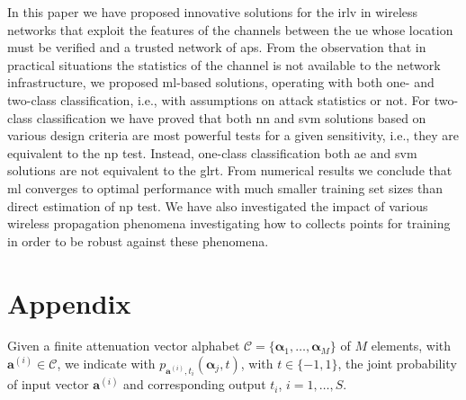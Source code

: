 \documentclass[draftcls,onecolumn,12pt]{IEEEtran}
\begin{document}
In this paper we have proposed innovative solutions for the \ac{irlv} in wireless networks that exploit the  features of the channels between the \ac{ue} whose location must be verified and a trusted network of \acp{ap}. From the observation that in practical situations the statistics of the channel is not available to the network infrastructure, we proposed \ac{ml}-based solutions, operating with both one- and two-class classification, i.e., with assumptions on attack statistics or not. For two-class classification we have proved that  both \ac{nn} and \ac{svm} solutions based on various design criteria are most powerful tests for a given sensitivity, i.e., they are equivalent to the \ac{np} test. Instead, one-class classification both \ac{ae} and \ac{svm} solutions are not equivalent to the \ac{glrt}. From numerical results we conclude that \ac{ml} converges to optimal performance with much smaller training set sizes than direct estimation of \ac{np} test. We have also investigated the impact of various wireless propagation phenomena investigating how to collects points for training in order to be robust against these phenomena.

\section*{Appendix}

	Given a finite  attenuation vector alphabet $\mathcal C = \{\bm{\alpha}_1, \ldots, \bm{\alpha}_M\}$ of $M$ elements, with $\bm{a}^{(i)} \in \mathcal C$, we indicate with $p_{\bm{a}^{(i)},t_i}(\bm{\alpha}_j, t)$, with $t \in \{-1,1\}$, the joint probability of input vector $\bm{a}^{(i)}$ and corresponding output $t_i$, $i=1, \ldots, S$.
	
\end{document}
